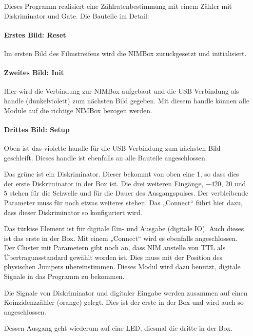\documentclass[11pt, ngerman, fleqn, DIV=15, headinclude, BCOR=2cm]{scrreprt}
\begin{document}
Dieses Programm realisiert eine Zählratenbestimmung mit einem Zähler mit
Diskriminator und Gate. Die Bauteile im Detail:

\paragraph{Erstes Bild: Reset}

Im ersten Bild des Filmstreifens wird die NIMBox zurückgesetzt und
initialisiert.

\paragraph{Zweites Bild: Init}

Hier wird die Verbindung zur NIMBox aufgebaut und die USB Verbindung als handle
(dunkelviolett) zum nächsten Bild gegeben. Mit diesem handle können alle Module
auf die richtige NIMBox bezogen werden.

\paragraph{Drittes Bild: Setup}

Oben ist das violette handle für die USB-Verbindung zum nächsten Bild
geschleift. Dieses handle ist ebenfalls an alle Bauteile angeschlossen.

Das grüne ist ein Diskriminator. Dieser bekommt von oben eine 1, so dass dies
der erste Diskriminator in der Box ist. Die drei weiteren Eingänge, $-420$, 20
und 5 stehen für die Schwelle und für die Dauer des Ausgangspulses. Der
verbleibende Parameter muss für noch etwas weiteres stehen. Das „Connect“ führt
hier dazu, dass dieser Diskriminator so konfiguriert wird.

Das türkise Element ist für digitale Ein- und Ausgabe (digitale IO). Auch
dieses ist das erste in der Box. Mit einem „Connect“ wird es ebenfalls
angeschlossen. Der Cluster mit Parametern gibt noch an, dass NIM anstelle von
TTL als Übertragunsstandard gewählt worden ist. Dies muss mit der Position des
physischen Jumpers übereinstimmen. Dieses Modul wird dazu benutzt, digitale
Signale in das Programm zu bekommen.

Die Signale von Diskriminator und digitaler Eingabe werden zusammen auf einen
Koinzidenzzähler (orange) gelegt. Dies ist der erste in der Box und wird auch
so angeschlossen.

Dessen Ausgang geht wiederum auf eine LED, diesmal die dritte in der Box.
\end{document}
